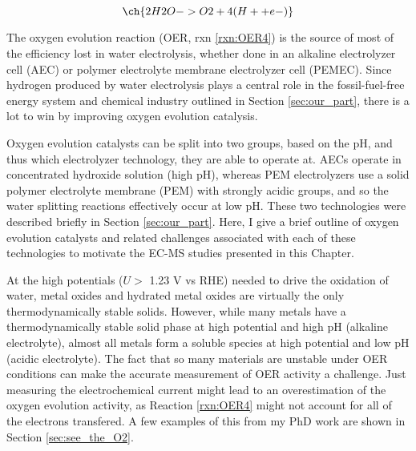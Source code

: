 
\begin{equation}
\ch{2 H2O -> O2 + 4 (H+ + e-)}\label{rxn:OER4}
\end{equation}

The oxygen evolution reaction (OER, rxn \ref{rxn:OER4}) is the source of most of the efficiency lost in water electrolysis\cite{Seh2017, Kibsgaard2019}, whether done in an alkaline electrolyzer cell (AEC)\cite{LeRoy1979, Dionigi2016b} or polymer electrolyte membrane electrolyzer cell (PEMEC)\cite{Carmo2013, Reier2017}. Since hydrogen produced by water electrolysis plays a central role in the fossil-fuel-free energy system and chemical industry outlined in Section \ref{sec:our_part}, there is a lot to win by improving oxygen evolution catalysis.

Oxygen evolution catalysts can be split into two groups, based on the pH, and thus which electrolyzer technology, they are able to operate at. AECs operate in concentrated hydroxide solution (high pH), whereas PEM electrolyzers use a solid polymer electrolyte membrane (PEM) with strongly acidic groups, and so the water splitting reactions effectively occur at low pH\cite{Carmo2013, Xiang2016}. These two technologies were described briefly in Section \ref{sec:our_part}. Here, I give a brief outline of oxygen evolution catalysts and related challenges associated with each of these technologies to motivate the EC-MS studies presented in this Chapter.

At the high potentials ($U>$ 1.23 V vs RHE) needed to drive the oxidation of water, metal oxides and hydrated metal oxides are virtually the only thermodynamically stable solids\cite{Pourbaix1966}. However, while many metals have a thermodynamically stable solid phase at high potential and high pH (alkaline electrolyte), almost all metals form a soluble species at high potential and low pH (acidic electrolyte). The fact that so many materials are unstable under OER conditions can make the accurate measurement of OER activity a challenge. Just measuring the electrochemical current might lead to an overestimation of the oxygen evolution activity, as Reaction \ref{rxn:OER4} might not account for all of the electrons transfered. A few examples of this from my PhD work are shown in Section \ref{sec:see_the_O2}.

